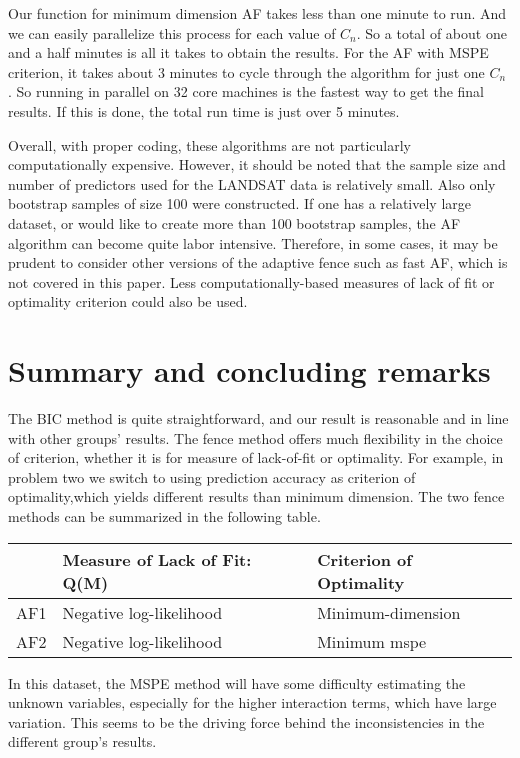 \documentclass[11pt,letter]{article}
\begin{document}
Our function for minimum dimension AF takes less than one minute to run. And we can easily parallelize this process for each value of $C_n$. So a total of about one and a half minutes is all it takes to obtain the results.
For the AF with MSPE criterion, it takes about 3 minutes to cycle through the algorithm for just one $C_n$ .  So running in parallel on 32 core machines is the fastest way to get the final results.  If this is done, the total run time is just over 5 minutes.  

Overall, with proper coding, these algorithms are not particularly computationally expensive.  However, it should be noted that the sample size and number of predictors used for the LANDSAT data is relatively small.  Also only bootstrap samples of size 100 were constructed.  If one has a relatively large dataset, or would like to create more than 100 bootstrap samples, the AF algorithm can become quite labor intensive.  Therefore, in some cases, it may be prudent to consider other versions of the adaptive fence such as fast AF, which is not covered in this paper.  Less computationally-based measures of lack of fit or optimality criterion could also be used.

\section{Summary and concluding remarks}
The BIC method is quite straightforward, and our result is reasonable and in line with other groups’ results.  The fence method offers much flexibility in the choice of criterion, whether it is for measure of lack-of-fit or optimality.  For example,  in problem two we switch to using prediction accuracy as criterion of optimality,which yields different results than minimum dimension.  The two fence methods can be summarized in the following table.

\begin{center}
  \begin{tabular}{ l | l | l }
    \hline
     & Measure of Lack of Fit: Q(M) & Criterion of Optimality \\ \hline
    AF1 & Negative log-likelihood & Minimum-dimension \\ \hline
    AF2 &Negative log-likelihood  & Minimum mspe \\
    \hline
  \end{tabular}
\end{center}

In this dataset, the MSPE method will have some difficulty estimating the unknown variables, especially for the higher interaction terms, which have large variation.  This seems to be the driving force behind the inconsistencies in the different group’s results. 
\end{document}
